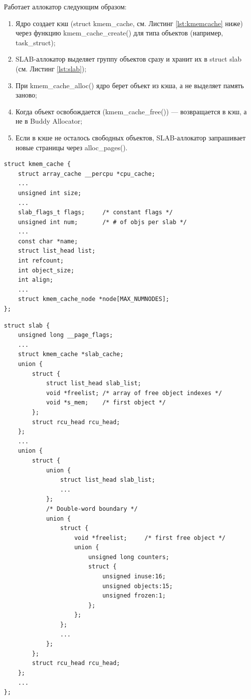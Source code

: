 Работает аллокатор следующим образом:
\begin{enumerate}
    \item Ядро создает кэш (struct kmem\_cache, см. Листинг \ref{lst:kmemcache} ниже) через функцию kmem\_cache\_create() для типа объектов (например, task\_struct);
    \item SLAB-аллокатор выделяет группу объектов сразу и хранит их в struct slab (см. Листинг \ref{lst:slab});
    \item При kmem\_cache\_alloc() ядро берет объект из кэша, а не выделяет память заново;
    \item Когда объект освобождается (kmem\_cache\_free()) --- возвращается в кэш, а не в Buddy Allocator;
    \item Если в кэше не осталось свободных объектов, SLAB-аллокатор запрашивает новые страницы через alloc\_pages().
\end{enumerate}

%

\begin{lstlisting}[label={lst:kmemcache}, caption={struct kmem\_cache}]
struct kmem_cache {
	struct array_cache __percpu *cpu_cache;
    ...
	unsigned int size;
    ...
	slab_flags_t flags;		/* constant flags */
	unsigned int num;		/* # of objs per slab */
    ...
	const char *name;
	struct list_head list;
	int refcount;
	int object_size;
	int align;
    ...
	struct kmem_cache_node *node[MAX_NUMNODES];
};
\end{lstlisting}

\begin{lstlisting}[label={lst:slab},caption={struct slab}]
struct slab {
	unsigned long __page_flags;
    ...
	struct kmem_cache *slab_cache;
	union {
		struct {
			struct list_head slab_list;
			void *freelist;	/* array of free object indexes */
			void *s_mem;	/* first object */
		};
		struct rcu_head rcu_head;
	};
    ...
	union {
		struct {
			union {
				struct list_head slab_list;
                ...
			};
			/* Double-word boundary */
			union {
				struct {
					void *freelist;		/* first free object */
					union {
						unsigned long counters;
						struct {
							unsigned inuse:16;
							unsigned objects:15;
							unsigned frozen:1;
						};
					};
				};
                ...
			};
		};
		struct rcu_head rcu_head;
	};
    ...
};
\end{lstlisting}


